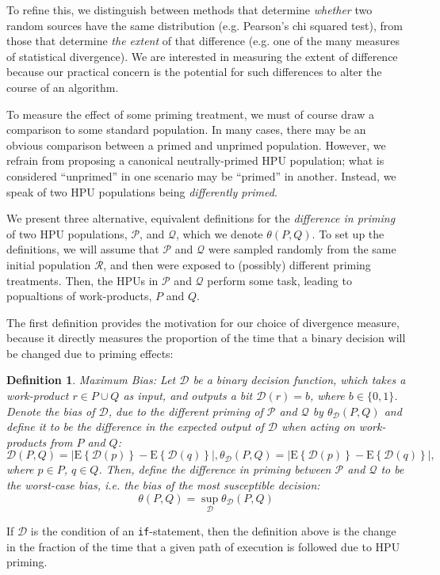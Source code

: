 \documentclass[12pt]{article}
\newtheorem{mydef}{Definition}
\begin{document}
To refine this, we distinguish between methods that determine \textit{whether}
two random sources have the same distribution 
(e.g. Pearson's chi squared test), from those that determine
\textit{the extent} of that difference (e.g. one of the many measures of 
statistical divergence).  We are interested in measuring the extent of
difference because our practical concern is the potential for such
differences to alter the course of an algorithm.

To measure the effect of some priming treatment, we must of course draw a 
comparison to some standard population.  In many cases, there may be an 
obvious comparison between a primed and unprimed population.  However, we 
refrain from proposing a canonical neutrally-primed HPU population; what is 
considered ``unprimed'' in one scenario may be ``primed'' in another. 
Instead, we speak of two HPU populations being \textit{differently primed}.

We present three alternative, equivalent definitions for the 
\textit{difference in priming} of two HPU populations, $\mathcal{P}$, and 
$\mathcal{Q}$, which we denote $\theta(P,Q)$.  To set up the definitions,
we will assume that $\mathcal{P}$ and $\mathcal{Q}$ 
were sampled randomly from the same initial population $\mathcal{R}$, and 
then were exposed to (possibly) different priming treatments. Then, the HPUs 
in $\mathcal{P}$ and $\mathcal{Q}$ perform some task, leading to popualtions 
of work-products, $P$ and $Q$.

The first definition provides the motivation for our choice of divergence
measure, because it directly measures the proportion of the time that a
binary decision will be changed due to priming effects:

\begin{mydef}
	\label{def:bias}
	{\upshape Maximum Bias:}
	Let $\mathcal{D}$ be a binary decision function, which takes a 
	work-product
	$r \in P \cup Q$ as input, and outputs a bit $\mathcal{D}(r)=b$, where 
	$b \in \{0,1\}$. Denote the \emph{bias} of $\mathcal{D}$, due to the
	different priming of $\mathcal{P}$ and $\mathcal{Q}$ by
	$\theta_\mathcal{D}(P,Q)$ and define it to be the difference 
	in the expected output of $\mathcal{D}$ when acting on work-products from 
	$P$ and $Q$:
	$$
	\mathcal{D}(P,Q) = 
		\left| 
			\mathrm{E}\left\{ \mathcal{D}(p) \right\} 
			- \mathrm{E}\left\{ \mathcal{D}(q) \right\} 
		\right|,
	\theta_\mathcal{D}(P,Q) = 
		\left| 
			\mathrm{E}\left\{ \mathcal{D}(p) \right\} 
			- \mathrm{E}\left\{ \mathcal{D}(q) \right\} 
		\right|,
	$$
	where $p \in P$, $q \in Q$.  Then, define the difference in priming 
	between $\mathcal{P}$ and $\mathcal{Q}$ to be the worst-case bias, i.e. 
	the bias of the most susceptible decision:
	$$
	\theta(P,Q) = 
		\sup_\mathcal{D} \theta_\mathcal{D}(P,Q)
	$$
\end{mydef}
If $\mathcal{D}$ is the condition of an \texttt{if}-statement, then the 
definition above is the change in the fraction of the time that a given 
path of execution is followed due to HPU priming.
\end{document}
